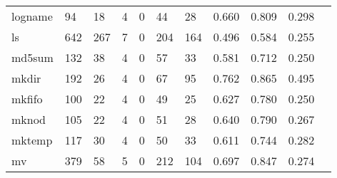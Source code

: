 \begin{longtable}{lp{1.10cm}p{1.10cm}p{1.10cm}p{1.10cm}p{1.10cm}p{1.10cm}p{1.10cm}p{1.10cm}p{1.10cm}p{1.10cm}}
logname   &                     94 &                                 18 &                                 4 &                                0 &                                44 &                              28 &                          0.660 &                                 0.809 &                               0.298 \\
ls        &                    642 &                                267 &                                 7 &                                0 &                               204 &                             164 &                          0.496 &                                 0.584 &                               0.255 \\
md5sum    &                    132 &                                 38 &                                 4 &                                0 &                                57 &                              33 &                          0.581 &                                 0.712 &                               0.250 \\
mkdir     &                    192 &                                 26 &                                 4 &                                0 &                                67 &                              95 &                          0.762 &                                 0.865 &                               0.495 \\
mkfifo    &                    100 &                                 22 &                                 4 &                                0 &                                49 &                              25 &                          0.627 &                                 0.780 &                               0.250 \\
mknod     &                    105 &                                 22 &                                 4 &                                0 &                                51 &                              28 &                          0.640 &                                 0.790 &                               0.267 \\
mktemp    &                    117 &                                 30 &                                 4 &                                0 &                                50 &                              33 &                          0.611 &                                 0.744 &                               0.282 \\
mv        &                    379 &                                 58 &                                 5 &                                0 &                               212 &                             104 &                          0.697 &                                 0.847 &                               0.274 \\

\end{longtable}
